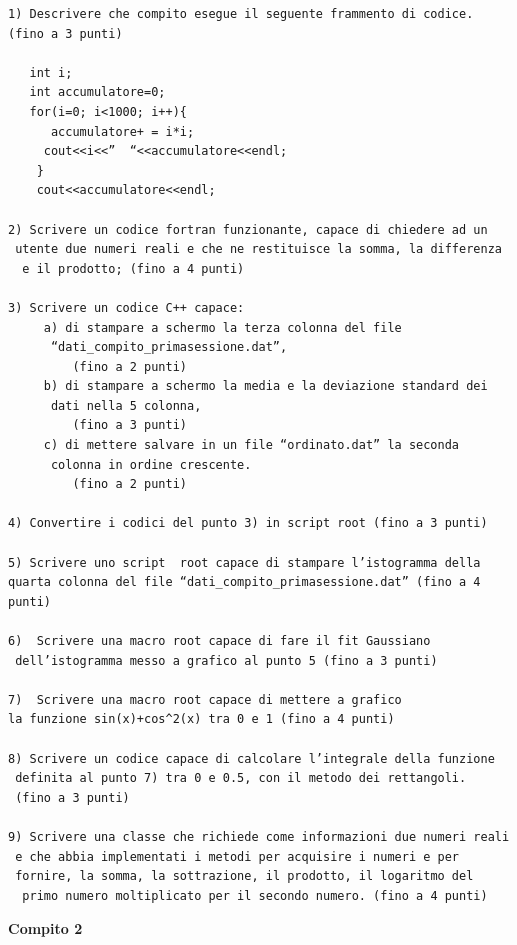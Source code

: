 \documentclass[11pt,fleqn]{book} %
\begin{document}
\begin{verbatim}
1) Descrivere che compito esegue il seguente frammento di codice. (fino a 3 punti)

   int i;
   int accumulatore=0;
   for(i=0; i<1000; i++){
      accumulatore+ = i*i;
     cout<<i<<”  “<<accumulatore<<endl;
    }
    cout<<accumulatore<<endl;

2) Scrivere un codice fortran funzionante, capace di chiedere ad un
 utente due numeri reali e che ne restituisce la somma, la differenza
  e il prodotto; (fino a 4 punti)

3) Scrivere un codice C++ capace:
     a) di stampare a schermo la terza colonna del file
      “dati_compito_primasessione.dat”, 
         (fino a 2 punti)
     b) di stampare a schermo la media e la deviazione standard dei
      dati nella 5 colonna,
         (fino a 3 punti)
     c) di mettere salvare in un file “ordinato.dat” la seconda
      colonna in ordine crescente.
         (fino a 2 punti)

4) Convertire i codici del punto 3) in script root (fino a 3 punti)

5) Scrivere uno script  root capace di stampare l’istogramma della
quarta colonna del file “dati_compito_primasessione.dat” (fino a 4 punti)

6)  Scrivere una macro root capace di fare il fit Gaussiano
 dell’istogramma messo a grafico al punto 5 (fino a 3 punti)

7)  Scrivere una macro root capace di mettere a grafico 
la funzione sin(x)+cos^2(x) tra 0 e 1 (fino a 4 punti)

8) Scrivere un codice capace di calcolare l’integrale della funzione
 definita al punto 7) tra 0 e 0.5, con il metodo dei rettangoli. 
 (fino a 3 punti)

9) Scrivere una classe che richiede come informazioni due numeri reali
 e che abbia implementati i metodi per acquisire i numeri e per 
 fornire, la somma, la sottrazione, il prodotto, il logaritmo del
  primo numero moltiplicato per il secondo numero. (fino a 4 punti)
\end{verbatim}

\textbf{Compito 2}
\end{document}
